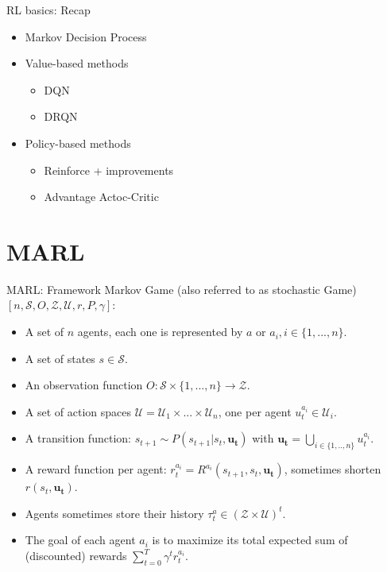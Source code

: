\documentclass{beamer}
\begin{document}
\begin{frame}{RL basics: Recap}

    

\begin{itemize}
    \item Markov Decision Process
    \vfill
    \item Value-based methods
        \begin{itemize}
        \item DQN
        \item DRQN
        \end{itemize}{}
    \vfill
    \item Policy-based methods
        \begin{itemize}
        \item Reinforce + improvements
        \item Advantage Actoc-Critic
        \end{itemize}{}
    \vfill
\end{itemize}{}

\end{frame}

\section{MARL}
\begin{frame}[plain]{}

\end{frame}
\begin{frame}{MARL: Framework}
    Markov Game (also referred to as stochastic Game) $[n, \mathcal{S}, O, \mathcal{Z}, \mathcal{U}, r, P, \gamma]$:
    \vfill
    \begin{itemize}
        \item A set of $n$ agents, each one is represented by $a$ or $a_i, i \in  \{1,...,n\}$.
        \vfill
        \item A set of states $s \in \mathcal{S}$.
        \vfill
        \item An observation function $O:\mathcal{S} \times \{1,...,n\} \rightarrow \mathcal{Z}$.
        \vfill
        \item A set of action spaces $\mathcal{U}=\mathcal{U}_1 \times ... \times \mathcal{U}_n$, one per agent $u^{a_i}_{t} \in \mathcal{U}_i$.
        \vfill
        \item A transition function: $s_{t+1} \sim P(s_{t+1} | s_t, \boldsymbol{u_t})$ with $\boldsymbol{u_t}=\bigcup_{i \in \{1,..,n\}} u^{a_i}_t$.
        \vfill
        \item A reward function per agent:  $r^{a_i}_t = R^{a_i}(s_{t+1}, s_t, \boldsymbol{u_t})$, sometimes shorten $r(s_t, \boldsymbol{u_t})$.
        \vfill
        \item Agents sometimes store their history $\tau^a_t \in (\mathcal{Z} \times \mathcal{U})^t$.
        \vfill
        \item The goal of each agent $a_i$ is to maximize its total expected sum of (discounted) rewards $\sum_{t=0}^{T} \gamma^t r^{a_i}_t$.
    \end{itemize}{}
\end{frame}
\end{document}

